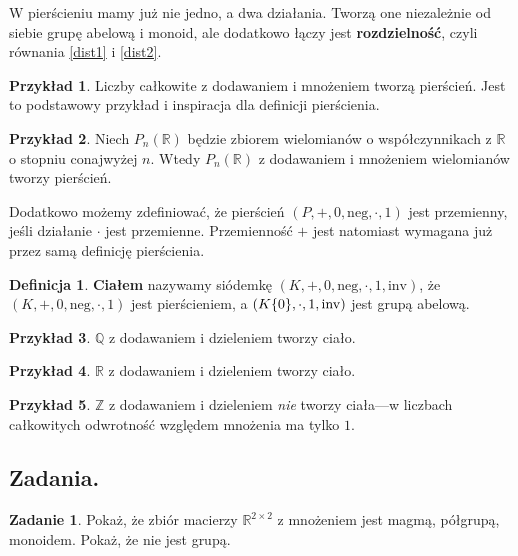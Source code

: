 \documentclass{article}
\theoremstyle{definition}
\newtheorem{definition}{Definicja}[section]
\newtheorem{example}{Przykład}[section]
\newtheorem{exercise}{Zadanie}[section]
\begin{document}
W pierścieniu mamy już nie jedno,
	a dwa działania.
Tworzą one niezależnie od siebie grupę abelową i monoid,
	ale dodatkowo łączy jest \textbf{rozdzielność},
	czyli równania \eqref{dist1} i \eqref{dist2}.

\begin{example}
	Liczby całkowite z dodawaniem i mnożeniem tworzą pierścień.
	Jest to podstawowy przykład i inspiracja dla definicji pierścienia.
\end{example}

\begin{example}
	Niech $P_n(\mathbb{R})$ będzie zbiorem wielomianów o współczynnikach z $\mathbb{R}$ o
		stopniu conajwyżej $n$.
	Wtedy $P_n(\mathbb{R})$ z dodawaniem i mnożeniem wielomianów tworzy pierścień.
\end{example}

Dodatkowo możemy zdefiniować,
	że pierścień $(P, +, 0, \mathrm{neg}, \cdot, 1)$ jest przemienny,
	jeśli działanie $\cdot$ jest przemienne.
Przemienność $+$ jest natomiast wymagana już przez samą definicję pierścienia.

\begin{definition}
	\textbf{Ciałem} nazywamy siódemkę $(K, +, 0, \mathrm{neg}, \cdot, 1, \mathrm{inv})$,
		że $(K, +, 0, \mathrm{neg}, \cdot, 1)$ jest pierścieniem,
		a $(K \\ \{0\}, \cdot, 1, \mathrm{inv})$ jest grupą abelową.
\end{definition}

\begin{example}
	$\mathbb{Q}$ z dodawaniem i dzieleniem tworzy ciało.
\end{example}

\begin{example}
	$\mathbb{R}$ z dodawaniem i dzieleniem tworzy ciało.
\end{example}

\begin{example}
	$\mathbb{Z}$ z dodawaniem i dzieleniem \textit{nie} tworzy ciała---w liczbach całkowitych
		odwrotność względem mnożenia ma tylko $1$.
\end{example}

\subsection{Zadania.}

\begin{exercise}
	Pokaż, że zbiór macierzy $\mathbb{R}^{2 \times 2}$ z mnożeniem
		jest magmą, półgrupą, monoidem.
	Pokaż, że nie jest grupą.
\end{exercise}
\end{document}
